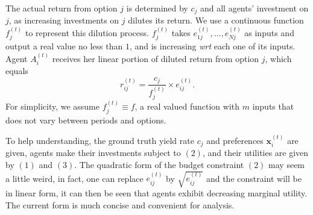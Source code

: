 \documentclass[12pt,english]{article}
\theoremstyle{plain}
\theoremstyle{plain}
\begin{document}
	The actual return from option $j$ is determined by $c_j$ and all agents' investment on $j$, as increasing investments on $j$ dilutes its return. We use a continuous function $f_j^{(t)}$ to represent this dilution process. $f_j^{(t)}$ takes $e_{1j}^{(t)}, \dots,e_{Nj}^{(t)}$ as inputs and output a real value no less than $1$, and is increasing \textit{wrt} each one of its inputs. Agent $A_i^{(t)}$ receives her linear portion of diluted return from option $j$, which equals
	\begin{equation}
	r_{ij}^{(t)} = \frac{c_j}{f_j^{(t)}} \times e_{ij}^{(t)}.
	\end{equation}
	For simplicity, we assume $f_j^{(t)} \equiv f$, a real valued function with $m$ inputs that does not vary between periods and options.\par
	
	To help understanding, the ground truth yield rate $c_j$ and preferences $\mathbf{x}_i^{(t)}$ are given, agents make their investments subject to $(2)$, and their utilities are given by $(1)$ and $(3)$. 
	The quadratic form of the budget constraint $(2)$ may seem a little weird, in fact, one can replace $e_{ij}^{(t)}$ by $\sqrt{e_{ij}^{(t)}}$ and the constraint will be in linear form, it can then be seen that agents exhibit decreasing marginal utility. The current form is much concise and convenient for analysis.
	
\end{document}
